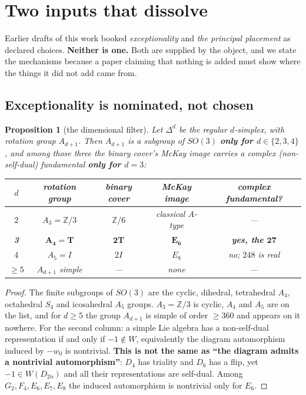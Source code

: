 \documentclass[11pt,reqno]{amsart}
\theoremstyle{plain}
\newtheorem{proposition}[theorem]{Proposition}
\theoremstyle{definition}
\theoremstyle{remark}
\newcommand{\Z}{\mathbb{Z}}
\begin{document}
\section{Two inputs that dissolve}\label{sec:nomination}

Earlier drafts of this work booked \emph{exceptionality} and \emph{the principal
placement} as declared choices. \textbf{Neither is one.} Both are supplied by the object,
and we state the mechanisms because a paper claiming that nothing is added must show
where the things it did not add came from.

\subsection{Exceptionality is nominated, not chosen}\label{sec:excnom}

\begin{proposition}[the dimensional filter]\label{prop:dimfilter}
Let $\Delta^d$ be the regular $d$-simplex, with rotation group $A_{d+1}$. Then $A_{d+1}$
is a subgroup of $SO(3)$ \textbf{only for $d\in\{2,3,4\}$}, and among those three the
binary cover's McKay image carries a complex (non-self-dual) fundamental
\textbf{only for $d=3$}:
\begin{center}\small
\begin{tabular}{@{}ccccc@{}}
\toprule
$d$ & rotation group & binary cover & McKay image & complex fundamental?\\
\midrule
$2$ & $A_3=\Z/3$ & $\Z/6$ & classical $A$-type & ---\\
\textbf{3} & $\mathbf{A_4=T}$ & $\mathbf{2T}$ & $\mathbf{E_6}$ & \textbf{yes, the $\mathbf{27}$}\\
$4$ & $A_5=I$ & $2I$ & $E_8$ & no; $248$ is real\\
$\ge5$ & $A_{d+1}$ simple & --- & none & ---\\
\bottomrule
\end{tabular}
\end{center}
\end{proposition}

\begin{proof}
The finite subgroups of $SO(3)$ are the cyclic, dihedral, tetrahedral $A_4$, octahedral
$S_4$ and icosahedral $A_5$ groups. $A_3=\Z/3$ is cyclic, $A_4$ and $A_5$ are on the
list, and for $d\ge5$ the group $A_{d+1}$ is simple of order $\ge360$ and appears on it
nowhere. For the second column: a simple Lie algebra has a non-self-dual representation
if and only if $-1\notin W$, equivalently the diagram automorphism induced by $-w_0$ is
nontrivial. \textbf{This is not the same as ``the diagram admits a nontrivial
automorphism''}: $D_4$ has triality and $D_6$ has a flip, yet $-1\in W(D_{2n})$ and all
their representations are self-dual. Among $G_2,F_4,E_6,E_7,E_8$ the induced automorphism
is nontrivial only for $E_6$.
\end{proof}
\end{document}
